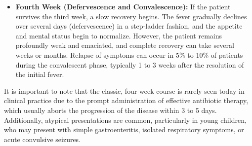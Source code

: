 \begin{itemize}
\item \textbf{Fourth Week (Defervescence and Convalescence):} If the patient survives the third week, a slow recovery begins. The fever gradually declines over several days (defervescence) in a step-ladder fashion, and the appetite and mental status begin to normalize. However, the patient remains profoundly weak and emaciated, and complete recovery can take several weeks or months. Relapse of symptoms can occur in 5\% to 10\% of patients during the convalescent phase, typically 1 to 3 weeks after the resolution of the initial fever.
\end{itemize}
It is important to note that the classic, four-week course is rarely seen today in clinical practice due to the prompt administration of effective antibiotic therapy, which usually aborts the progression of the disease within 3 to 5 days. Additionally, atypical presentations are common, particularly in young children, who may present with simple gastroenteritis, isolated respiratory symptoms, or acute convulsive seizures.

